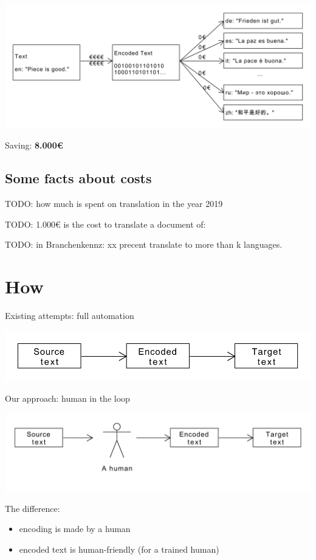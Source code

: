 \documentclass{article}
\begin{document}
\includegraphics[scale=0.4]{dia/user-view-tokimani.pdf}

Saving: \textbf{8.000€}

\subsection{Some facts about costs}
TODO: how much is spent on translation in the year 2019

TODO: 1.000€ is the cost to translate a document of: 

TODO: in Branchenkennz: xx precent translate to more than k languages.

\section{How}

Existing attempts: full automation

\includegraphics[scale=0.5]{dia/how-current-world.pdf}

Our approach: human in the loop

\includegraphics[scale=0.5]{dia/how-tokimani.pdf}

The difference:
\begin{itemize}
\item encoding is made by a human
\item encoded text is human-friendly (for a trained human)
\end{itemize}
\end{document}
